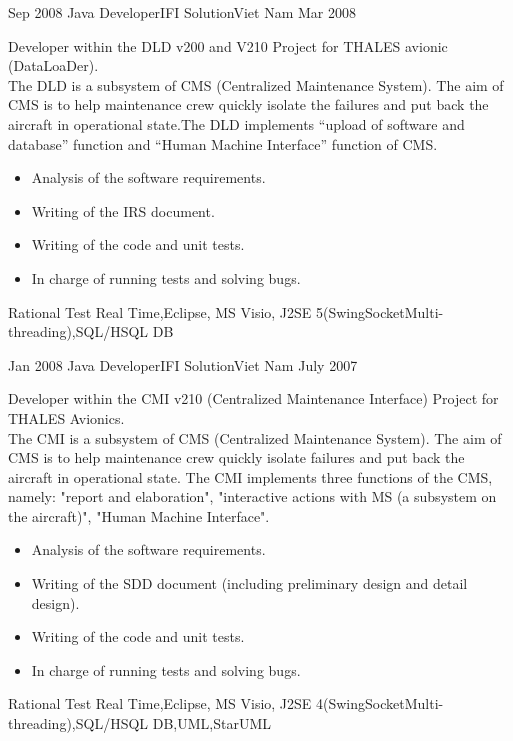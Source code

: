 \begin{experiences}
\experience
  {Sep 2008}  {Java Developer}{IFI Solution}{Viet Nam}
  {Mar 2008}   {
Developer within the DLD v200 and V210 Project for THALES avionic (DataLoaDer).\\
The DLD is a subsystem of CMS (Centralized Maintenance System). The aim of CMS is to help maintenance crew quickly isolate the failures and put back the aircraft in operational state.The DLD implements “upload of software and database” function and “Human Machine Interface” function of CMS.
	\begin{itemize}
        \item Analysis of the software requirements.       
        \item Writing of the IRS document.   
        \item Writing of the code and unit tests.
        \item In charge of running tests and solving bugs. 					\end{itemize}
}
{Rational Test Real Time,Eclipse, MS Visio, J2SE 5(Swing\cdot Socket\cdot Multi-threading),SQL/HSQL DB}
\emptySeparator

\experience
  {Jan 2008}  {Java Developer}{IFI Solution}{Viet Nam}
  {July 2007}   {
Developer within the CMI v210 (Centralized Maintenance Interface) Project for THALES Avionics.\\
The CMI is a subsystem of CMS (Centralized Maintenance System). The aim of CMS is to help maintenance crew quickly isolate failures and put back the aircraft in operational state. The CMI implements three functions of the CMS, namely: "report and elaboration", "interactive actions with MS (a subsystem on the aircraft)", "Human Machine Interface".
	\begin{itemize}
		\item Analysis of the software requirements.      
        \item Writing of the SDD document (including preliminary design and detail design).       
        \item Writing of the code and unit tests.         
        \item In charge of running tests and solving bugs.                      \end{itemize}                 
}
{Rational Test Real Time,Eclipse, MS Visio, J2SE 4(Swing\cdot Socket\cdot  Multi-threading),SQL/HSQL DB,UML,StarUML}

\end {experiences}